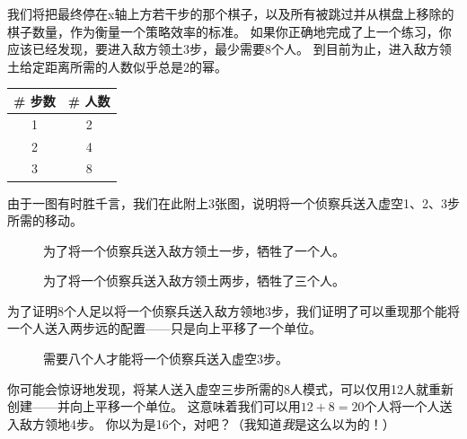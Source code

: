 我们将把最终停在x轴上方若干步的那个棋子，以及所有被跳过并从棋盘上移除的棋子数量，作为衡量一个策略效率的标准。
如果你正确地完成了上一个练习，你应该已经发现，要进入敌方领土3步，最少需要8个人。
到目前为止，进入敌方领土给定距离所需的人数似乎总是2的幂。

\begin{center}
\begin{tabular}{c|c}
\# 步数 & \# 人数 \\ \hline
1 & 2 \\
2 & 4 \\
3 & 8 \\
\end{tabular}
\end{center}  

由于一图有时胜千言，我们在此附上3张图，说明将一个侦察兵送入虚空1、2、3步所需的移动。

\begin{figure}[!hbtp] 
\begin{center}

\end{center}
\caption[迈入虚空一步是微不足道的。]{为了将一个侦察兵送入敌方领土一步，牺牲了一个人。}
\label{fig:one_step}
\end{figure}

\begin{figure}[!hbtp] 
\begin{center}

\end{center}
\caption[迈入虚空两步更加困难。]{为了将一个侦察兵送入敌方领土两步，牺牲了三个人。}
\label{fig:two_steps}
\end{figure}

为了证明8个人足以将一个侦察兵送入敌方领地3步，我们证明了可以重现那个能将一个人送入两步远的配置——只是向上平移了一个单位。

\begin{figure}[!hbtp] 
\hspace{-.2in}
\caption[迈入虚空三步需要8个人。]{需要八个人才能将一个侦察兵送入虚空3步。}
\label{fig:three_steps}
\end{figure}

你可能会惊讶地发现，将某人送入虚空三步所需的8人模式，可以仅用12人就重新创建——并向上平移一个单位。
这意味着我们可以用$12 + 8 = 20$个人将一个人送入敌方领地4步。
你以为是16个，对吧？（我知道\emph{我}是这么以为的！）

